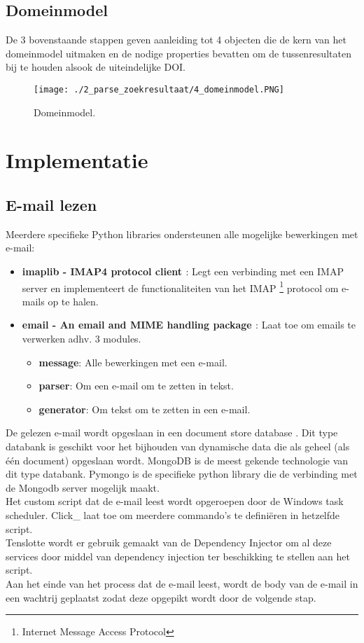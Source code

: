 \subsection{Domeinmodel}
De 3 bovenstaande stappen geven aanleiding tot 4 objecten die de kern van het domeinmodel uitmaken en de nodige properties bevatten om de tussenresultaten bij te houden alsook de uiteindelijke DOI.
\begin{figure}[h!]
    \centering
    \texttt{[image: ./2\_parse\_zoekresultaat/4\_domeinmodel.PNG]}
    \caption[Domeinmodel.]{\label{fig:Domeinmodel}Domeinmodel.}
\end{figure}
\newpage
\section{Implementatie}
\subsection{E-mail lezen}
Meerdere specifieke Python libraries ondersteunen alle mogelijke bewerkingen met e-mail:
\begin{itemize}
    \item \textbf{imaplib - IMAP4 protocol client \autocite{Imaplib2025}}: Legt een verbinding met een IMAP server en implementeert de functionaliteiten van het IMAP \footnote{Internet Message Access Protocol} protocol om e-mails op te halen.\autocite{Imap2025}
    \item \textbf{email - An email and MIME handling package \autocite{Email2025}}: Laat toe om emails te verwerken adhv. 3 modules.
    \begin{itemize}
        \item \textbf{message}: Alle bewerkingen met een e-mail.
        \item \textbf{parser}: Om een e-mail om te zetten in tekst.
        \item \textbf{generator}: Om tekst om te zetten in een e-mail. 
    \end{itemize}
\end{itemize}
De gelezen e-mail wordt opgeslaan in een document store database \autocite{Documentstore2025}. Dit type databank is geschikt voor het bijhouden van dynamische data die als geheel (als één document) opgeslaan wordt. MongoDB \autocite{Mongodb2025} is de meest gekende technologie van dit type databank. Pymongo \autocite{Pymongo2025} is de specifieke python library die de verbinding met de Mongodb server mogelijk maakt.\\
Het custom script dat de e-mail leest wordt opgeroepen door de Windows task scheduler. Click\_ \autocite{Click2025} laat toe om meerdere commando's te definiëren in hetzelfde script.\\
Tenslotte wordt er gebruik gemaakt van de Dependency Injector \autocite{Dependencyinjector2025} om al deze services door middel van dependency injection \autocite{Di2025} ter beschikking te stellen aan het script.\\
Aan het einde van het process dat de e-mail leest, wordt de body van de e-mail in een wachtrij geplaatst zodat deze opgepikt wordt door de volgende stap.
